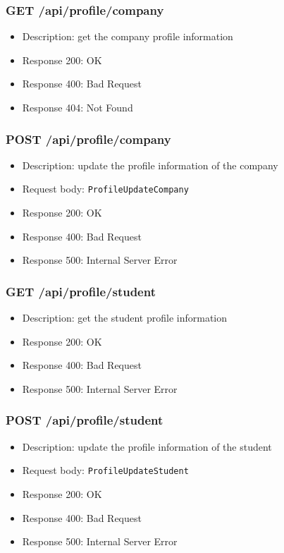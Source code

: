 \subsubsection{GET /api/profile/company}
\begin{itemize}
    \item Description: get the company profile information
    \item Response 200: OK
    \item Response 400: Bad Request
    \item Response 404: Not Found
\end{itemize}

\subsubsection{POST /api/profile/company}
\begin{itemize}
    \item Description: update the profile information of the company
    \item Request body: \verb|ProfileUpdateCompany|
    \item Response 200: OK
    \item Response 400: Bad Request
    \item Response 500: Internal Server Error
\end{itemize}

\subsubsection{GET /api/profile/student}
\begin{itemize}
    \item Description: get the student profile information
    \item Response 200: OK
    \item Response 400: Bad Request
    \item Response 500: Internal Server Error
\end{itemize}

\subsubsection{POST /api/profile/student}
\begin{itemize}
    \item Description: update the profile information of the student
    \item Request body: \verb|ProfileUpdateStudent|
    \item Response 200: OK
    \item Response 400: Bad Request
    \item Response 500: Internal Server Error
\end{itemize}


